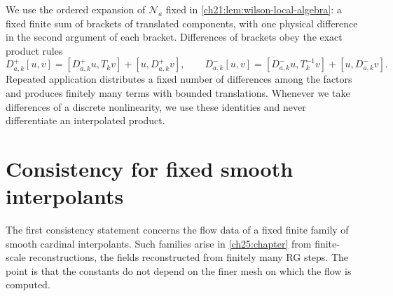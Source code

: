 We use the ordered expansion of $\mathcal N_a$ fixed in \cref{ch21:lem:wilson-local-algebra}: a fixed finite sum of brackets of translated components, with one physical difference in the second argument of each bracket. Differences of brackets obey the exact product rules
\begin{equation}\label{ch22:eq:shifted-product}
 D_{a,k}^+[u,v]=[D_{a,k}^+u,T_kv]+[u,D_{a,k}^+v],\qquad
 D_{a,k}^-[u,v]=[D_{a,k}^-u,T_k^{-1}v]+[u,D_{a,k}^-v].
\end{equation}
Repeated application distributes a fixed number of differences among the factors and produces finitely many terms with bounded translations. Whenever we take differences of a discrete nonlinearity, we use these identities and never differentiate an interpolated product.

\section{Consistency for fixed smooth interpolants}\label{ch22:sec:fixed-interpolants}

The first consistency statement concerns the flow data of a fixed finite family of smooth cardinal interpolants. Such families arise in \cref{ch25:chapter} from finite-scale reconstructions, the fields reconstructed from finitely many RG steps. The point is that the constants do not depend on the finer mesh on which the flow is computed.

